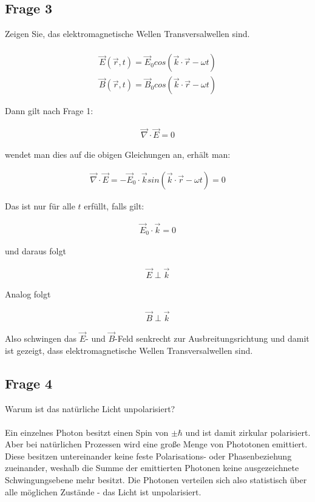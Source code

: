 \documentclass[a4paper,10pt]{scrartcl}
\begin{document}
		\subsection{Frage 3}
			Zeigen Sie, das elektromagnetische Wellen Transversalwellen sind.\\
			\\
			\begin{align*}
			\vec{E}(\vec{r},t)=\vec{E}_{0}cos(\vec{k}\cdot\vec{r}-\omega t)
			\end{align*}
			\begin{align*}
			\vec{B}(\vec{r},t)=\vec{B}_{0}cos(\vec{k}\cdot\vec{r}-\omega t)
			\end{align*}
			
			\newpage
			
			Dann gilt nach Frage 1:
			
			\begin{align*}
			\vec{\nabla}\cdot\vec{E}=0
			\end{align*}
			
			wendet man dies auf die obigen Gleichungen an, erhält man:
			
			\begin{align*}
			\vec{\nabla}\cdot\vec{E}=-\vec{E}_{0}\cdot\vec{k}sin(\vec{k}\cdot\vec{r}-\omega t)=0
			\end{align*}
			
			Das ist nur für alle \(t\) erfüllt, falls gilt:
			
			\begin{align*}
			\vec{E}_{0}\cdot\vec{k}=0 
			\end{align*}
			
			und daraus folgt
			
			\begin{align*}
			\vec{E} \perp \vec{k}
			\end{align*}
			
			Analog folgt
			
			\begin{align*}
			\vec{B}\perp\vec{k}
			\end{align*}
			
			Also schwingen das \(\vec{E}\)- und \(\vec{B}\)-Feld senkrecht zur Ausbreitungsrichtung und damit ist gezeigt, dass elektromagnetische Wellen Transversalwellen sind.
			
		\subsection{Frage 4}
			Warum ist das natürliche Licht unpolarisiert?\\
			\\
			Ein einzelnes Photon besitzt einen Spin von \(\pm \hbar\) und ist damit zirkular polarisiert. Aber bei natürlichen Prozessen wird eine große Menge von Phototonen emittiert. Diese besitzen untereinander keine feste Polarisations- oder Phasenbeziehung zueinander, weshalb die Summe der emittierten Photonen keine ausgezeichnete Schwingungsebene mehr besitzt. Die Photonen verteilen sich also statistisch über alle möglichen Zustände - das Licht ist unpolarisiert.
			
\end{document}
